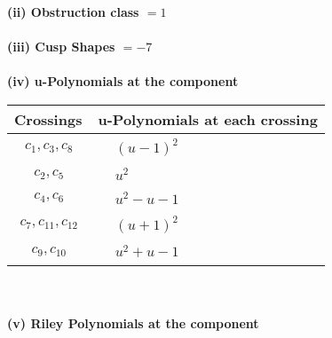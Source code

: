 \documentclass[1p]{elsarticle_modified}
\theoremstyle{definition}
\begin{document}
\flushleft \textbf{(ii) Obstruction class $= 1$}\\~\\
\flushleft \textbf{(iii) Cusp Shapes $= -7$}\\~\\
\newpage\renewcommand{\arraystretch}{1}
\flushleft \textbf{(iv) u-Polynomials at the component}\newline \\
\begin{tabular}{m{50pt}|m{274pt}}
Crossings & \hspace{64pt}u-Polynomials at each crossing \\
\hline $$\begin{aligned}c_{1},c_{3},c_{8}\end{aligned}$$&$\begin{aligned}
&(u-1)^2
\end{aligned}$\\
\hline $$\begin{aligned}c_{2},c_{5}\end{aligned}$$&$\begin{aligned}
&u^2
\end{aligned}$\\
\hline $$\begin{aligned}c_{4},c_{6}\end{aligned}$$&$\begin{aligned}
&u^2- u-1
\end{aligned}$\\
\hline $$\begin{aligned}c_{7},c_{11},c_{12}\end{aligned}$$&$\begin{aligned}
&(u+1)^2
\end{aligned}$\\
\hline $$\begin{aligned}c_{9},c_{10}\end{aligned}$$&$\begin{aligned}
&u^2+u-1
\end{aligned}$\\
\hline
\end{tabular}\\~\\
\newpage\renewcommand{\arraystretch}{1}
\flushleft \textbf{(v) Riley Polynomials at the component}\newline \\
\end{document}
